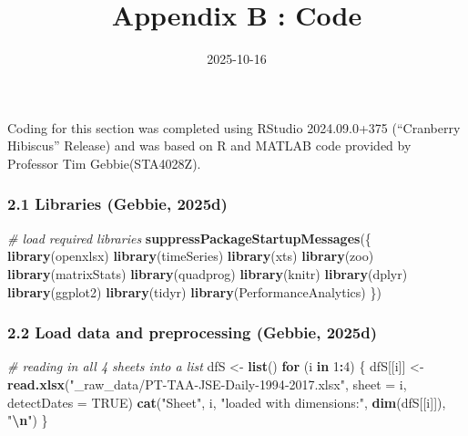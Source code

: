 \documentclass[
  12pt,
]{article}
\title{Appendix B : Code}
\author{}
\date{\vspace{-2.5em}2025-10-16}
\newenvironment{Shaded}{\begin{snugshade}}{\end{snugshade}}
\newcommand{\AttributeTok}[1]{\textcolor[rgb]{0.13,0.29,0.53}{#1}}
\newcommand{\CommentTok}[1]{\textcolor[rgb]{0.56,0.35,0.01}{\textit{#1}}}
\newcommand{\ConstantTok}[1]{\textcolor[rgb]{0.56,0.35,0.01}{#1}}
\newcommand{\ControlFlowTok}[1]{\textcolor[rgb]{0.13,0.29,0.53}{\textbf{#1}}}
\newcommand{\DecValTok}[1]{\textcolor[rgb]{0.00,0.00,0.81}{#1}}
\newcommand{\FunctionTok}[1]{\textcolor[rgb]{0.13,0.29,0.53}{\textbf{#1}}}
\newcommand{\NormalTok}[1]{#1}
\newcommand{\OtherTok}[1]{\textcolor[rgb]{0.56,0.35,0.01}{#1}}
\newcommand{\SpecialCharTok}[1]{\textcolor[rgb]{0.81,0.36,0.00}{\textbf{#1}}}
\newcommand{\StringTok}[1]{\textcolor[rgb]{0.31,0.60,0.02}{#1}}
\begin{document}
\maketitle

Coding for this section was completed using RStudio 2024.09.0+375
(``Cranberry Hibiscus'' Release) and was based on R and MATLAB code
provided by Professor Tim Gebbie(STA4028Z).

\subsubsection{2.1 Libraries (Gebbie, 2025d)}\label{libraries-tim_prep}

\begin{Shaded}
\begin{Highlighting}[]
\CommentTok{\# load required libraries}
\FunctionTok{suppressPackageStartupMessages}\NormalTok{(\{}
\FunctionTok{library}\NormalTok{(openxlsx)     }
\FunctionTok{library}\NormalTok{(timeSeries)   }
\FunctionTok{library}\NormalTok{(xts)          }
\FunctionTok{library}\NormalTok{(zoo)          }
\FunctionTok{library}\NormalTok{(matrixStats) }
\FunctionTok{library}\NormalTok{(quadprog)     }
\FunctionTok{library}\NormalTok{(knitr)        }
\FunctionTok{library}\NormalTok{(dplyr)        }
\FunctionTok{library}\NormalTok{(ggplot2)      }
\FunctionTok{library}\NormalTok{(tidyr)  }
\FunctionTok{library}\NormalTok{(PerformanceAnalytics)}
\NormalTok{\})}
\end{Highlighting}
\end{Shaded}

\subsubsection{2.2 Load data and preprocessing (Gebbie,
2025d)}\label{load-data-and-preprocessing-tim_prep}

\begin{Shaded}
\begin{Highlighting}[]
\CommentTok{\# reading in all 4 sheets into a list}
\NormalTok{dfS }\OtherTok{\textless{}{-}} \FunctionTok{list}\NormalTok{()}
\ControlFlowTok{for}\NormalTok{ (i }\ControlFlowTok{in} \DecValTok{1}\SpecialCharTok{:}\DecValTok{4}\NormalTok{) \{}
\NormalTok{  dfS[[i]] }\OtherTok{\textless{}{-}} \FunctionTok{read.xlsx}\NormalTok{(}\StringTok{"\_raw\_data/PT{-}TAA{-}JSE{-}Daily{-}1994{-}2017.xlsx"}\NormalTok{, }\AttributeTok{sheet =}\NormalTok{ i, }\AttributeTok{detectDates =} \ConstantTok{TRUE}\NormalTok{)}
  \FunctionTok{cat}\NormalTok{(}\StringTok{"Sheet"}\NormalTok{, i, }\StringTok{"loaded with dimensions:"}\NormalTok{, }\FunctionTok{dim}\NormalTok{(dfS[[i]]), }\StringTok{"}\SpecialCharTok{\textbackslash{}n}\StringTok{"}\NormalTok{)}
\NormalTok{\}}
\end{Highlighting}
\end{Shaded}
\end{document}
